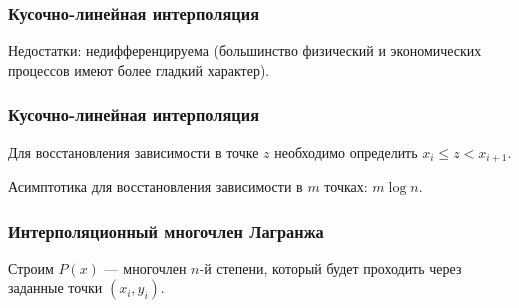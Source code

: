\documentclass[10pt]{beamer}
\begin{document}
\begin{frame}[fragile]
\frametitle{Кусочно-линейная интерполяция}

Недостатки: недифференцируема (большинство физический и экономических процессов имеют более гладкий характер).

\end{frame}



\begin{frame}[fragile]
\frametitle{Кусочно-линейная интерполяция}

Для восстановления зависимости в точке $z$ необходимо определить $x_i \leqslant z < x_{i+1}$. 

\vfill

Асимптотика для восстановления зависимости в $m$ точках: $m \log{n}$. 


\end{frame}

\begin{frame}[fragile]
\frametitle{Интерполяционный многочлен Лагранжа}

Строим $P(x)$ --- многочлен $n$-й степени, который будет проходить через заданные точки $(x_i, y_i)$.


\begin{center}
\end{center}
\end{frame}
\end{document}
